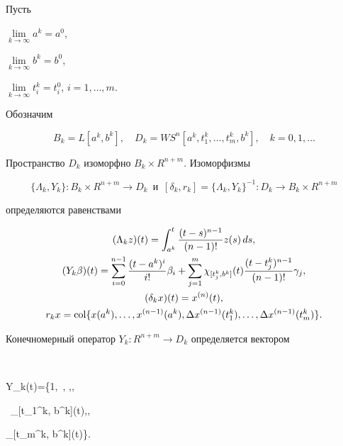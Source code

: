 Пусть


$\lim\limits_{k\to\infty} a^k = a^0$,


$\lim\limits_{k\to\infty} b^k=b^0$,


$\lim\limits_{k\to\infty} t_i^k = t_i^0$, $i=1,\dotsc,m$.


Обозначим


$$


B_k=L[a^k,b^k],\quad D_k=WS^n[a^k,t_1^k,\dotsc,t_m^k,b^k],\quad k=0,1,\dotsc


$$


Пространство $D_k$ изоморфно $B_k\times R^{n+m}$. Изоморфизмы


$$


\{\Lambda_k,Y_k\}:B_k\times R^{n+m} \to D_k


\ \; \text{и}\ \;


[\delta_k,r_k]= \{\Lambda_k,Y_k\}^{-1}:D_k\to B_k\times R^{n+m}


$$


определяются равенствами


\begin{gather*}


(\Lambda_k z)(t) = \int_{a^k}^t \frac{(t-s)^{n-1}}{(n-1)!} z(s)\,ds,\\


%


(Y_k \beta)(t)=\sum_{i=0}^{n-1}\frac{(t-a^k)^i}{i!} \beta_i + \sum_{j=1}^m


\chi_{[t_j^k, b^k]}(t) \frac{(t-t_j^k)^{n-1}}{(n-1)!} \gamma_j, \\


%


(\delta_k x)(t) = x^{(n)} (t), \\


%


r_k x = \col \{x(a^k),\dotsc, x^{(n-1)}(a^k), \Delta x^{(n-1)}(t_1^k),


\dotsc,\Delta x^{(n-1)}(t_m^k)\}.


\end{gather*}


Конечномерный оператор $Y_k:R^{n+m}\to D_k$ определяется вектором


$$


Y_k(t)=\bigg\{1,\ , \dotsc,,


\ \chi_{[t_1^k, b^k]}(t),\dotsc,


\chi_{[t_m^k, b^k]}(t)\bigg\}.


